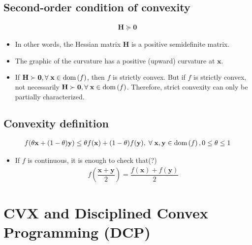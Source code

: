 \documentclass{article}
\newcommand{\dom}[1]{\ensuremath{\textnormal{dom}\left(#1\right)}} %
\begin{document}
\subsection{Second-order condition of convexity}
\begin{align}
    \mathbf{H}\succeq \mathbf{0}
\end{align}
\begin{itemize}
    \item In other words, the Hessian matrix \(\mathbf{H}\) is a positive semidefinite matrix.
    \item The graphic of the curvature has a positive (upward) curvature at \(\mathbf{x}\).
    \item If \(\mathbf{H}\succ\mathbf{0}, \forall\; \mathbf{x} \in \dom{f}\), then \(f\) is strictly convex. But if \(f\) is strictly convex, not necessarily \(\mathbf{H}\succ\mathbf{0},\forall\; \mathbf{x} \in \dom{f}\). Therefore, strict convexity can only be partially characterized.
\end{itemize}
\subsection{Convexity definition}
\begin{align}
    f(\theta\mathbf{x}+(1-\theta)\mathbf{y}) \leq \theta f(\mathbf{x}) + (1-\theta)f(\mathbf{y}),\;\forall\; \mathbf{x}, \mathbf{y} \in \dom{f}, 0\leq\theta\leq 1
\end{align}
\begin{itemize}
	\item If \(f\) is continuous, it is enough to check that(?)
    \begin{align}
        f\left( \dfrac{\mathbf{x}+\mathbf{y}}{2} \right) = \dfrac{f(\mathbf{x}) + f(\mathbf{y})}{2}
    \end{align}
\end{itemize}

\section{CVX and Disciplined Convex Programming (DCP)}
\end{document}
